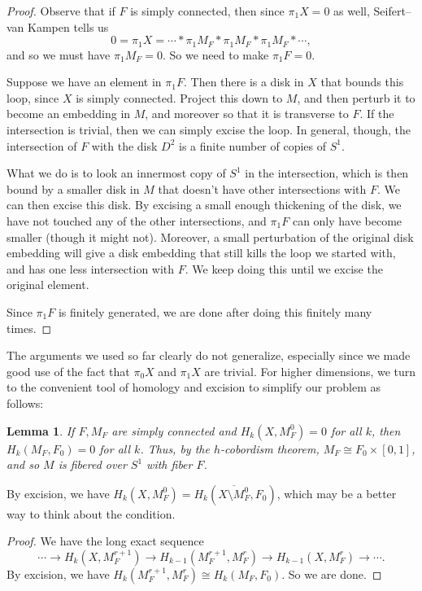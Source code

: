 \documentclass[a4paper, 12pt]{article}
\newtheorem{lemma}[thm]{Lemma}
\theoremstyle{definition}
\begin{document}
\begin{proof}
  Observe that if $F$ is simply connected, then since $\pi_1X = 0$ as well, Seifert--van Kampen tells us 
  \[
    0 = \pi_1 X = \cdots *\pi_1M_F * \pi_1M_F * \pi_1 M_F * \cdots,
  \]
  and so we must have $\pi_1 M_F = 0$. So we need to make $\pi_1 F = 0$.

  Suppose we have an element in $\pi_1 F$. Then there is a disk in $X$ that bounds this loop, since $X$ is simply connected. Project this down to $M$, and then perturb it to become an embedding in $M$, and moreover so that it is transverse to $F$. If the intersection is trivial, then we can simply excise the loop. In general, though, the intersection of $F$ with the disk $D^2$ is a finite number of copies of $S^1$.
  
  What we do is to look an innermost copy of $S^1$ in the intersection, which is then bound by a smaller disk in $M$ that doesn't have other intersections with $F$. We can then excise this disk. By excising a small enough thickening of the disk, we have not touched any of the other intersections, and $\pi_1 F$ can only have become smaller (though it might not). Moreover, a small perturbation of the original disk embedding will give a disk embedding that still kills the loop we started with, and has one less intersection with $F$. We keep doing this until we excise the original element.

  Since $\pi_1 F$ is finitely generated, we are done after doing this finitely many times.
\end{proof}

The arguments we used so far clearly do not generalize, especially since we made good use of the fact that $\pi_0 X$ and $\pi_1 X$ are trivial. For higher dimensions, we turn to the convenient tool of homology and excision to simplify our problem as follows:
\begin{lemma}
  If $F, M_F$ are simply connected and $H_k(X, M_F^0) = 0$ for all $k$, then $H_k(M_F, F_0) = 0$ for all $k$. Thus, by the $h$-cobordism theorem, $M_F \cong F_0 \times [0, 1]$, and so $M$ is fibered over $S^1$ with fiber $F$.
\end{lemma}
By excision, we have $H_k(X, M_F^0) = H_k(\overline{X \setminus M_F^0}, F_0)$, which may be a better way to think about the condition.

\begin{proof}
  We have the long exact sequence
  \[
    \cdots \to H_k(X, M_F^{r + 1}) \to H_{k - 1}(M_F^{r + 1}, M_F^r) \to H_{k - 1}(X, M_F^r) \to \cdots.
  \]
  By excision, we have $H_k(M_F^{r + 1}, M_F^r) \cong H_k(M_F, F_0)$. So we are done.
\end{proof}
\end{document}
